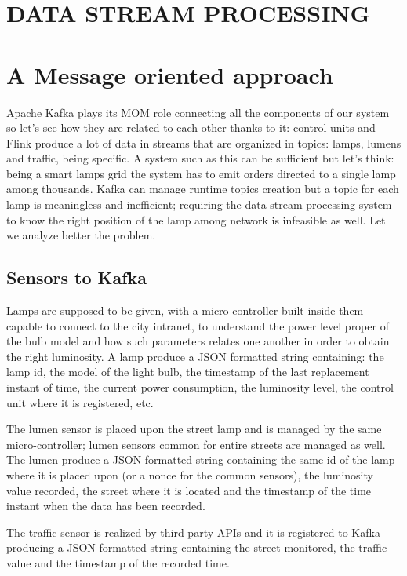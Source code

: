 \section{DATA STREAM PROCESSING}


\section{A Message oriented approach}
Apache Kafka plays its MOM role connecting all the components of our system so let’s see how they are related to each other thanks to it: control units and Flink produce a lot of data in streams that are organized in topics: lamps, lumens and traffic, being specific. A system such as this can be sufficient but let’s think: being a smart lamps grid the system has to emit orders directed to a single lamp among thousands. Kafka can manage runtime topics creation but a topic for each lamp is meaningless and inefficient; requiring the data stream processing system to know the right position of the lamp among network is infeasible as well. Let we analyze better the problem.


\subsection{Sensors to Kafka}
Lamps are supposed to be given, with a micro-controller built inside them capable to connect to the city intranet, to understand the power level proper of the bulb model and how such parameters relates one another in order to obtain the right luminosity. A lamp produce a JSON formatted string containing: the lamp id, the model of the light bulb, the timestamp of the last replacement instant of time, the current power consumption, the luminosity level, the control unit where it is registered, etc.

The lumen sensor is placed upon the street lamp and is managed by the same micro-controller; lumen sensors common for entire streets are managed as well. The lumen produce a JSON formatted string containing the same id of the lamp where it is placed upon (or a nonce for the common sensors), the luminosity value recorded, the street where it is located and the timestamp of the time instant when the data has been recorded.

The traffic sensor is realized by third party APIs and it is registered to Kafka producing a JSON formatted string containing the street monitored, the traffic value and the timestamp of the recorded time.

